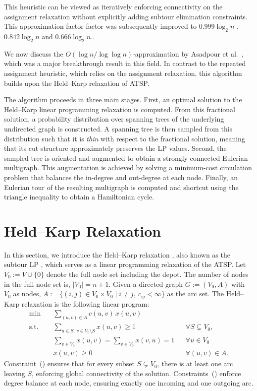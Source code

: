 \documentclass[12pt]{report}
\renewcommand{\eqref}[1]{\textup{(\textcolor{eqred}{\getrefnumber{#1}})}}
\theoremstyle{definition}
\begin{document}
This heuristic can be viewed as iteratively enforcing connectivity on the assignment relaxation without explicitly adding subtour elimination constraints. This approximation factor factor was subsequently improved to $0.999 \log_2 n$ \cite{blaser2002}, $0.842 \log_2 n$ \cite{Kaplan_decomposing} and $0.666 \log_2 n$.\cite{Singh_improved}.

We now discuss the $O(\log n / \log \log n)$-approximation by Asadpour et al.~\cite{asadpour}, which was a major breakthrough result in this field. In contrast to the repeated assignment heuristic, which relies on the assignment relaxation, this algorithm builds upon the Held--Karp relaxation \cite{HK_relaxation} of ATSP. 

The algorithm proceeds in three main stages. First, an optimal solution to the Held--Karp linear programming relaxation is computed. From this fractional solution, a probability distribution over spanning trees of the underlying undirected graph is constructed. A spanning tree is then sampled from this distribution such that it is \emph{thin} with respect to the fractional solution, meaning that its cut structure approximately preserves the LP values. Second, the sampled tree is oriented and augmented to obtain a strongly connected Eulerian multigraph. This augmentation is achieved by solving a minimum-cost circulation problem that balances the in-degree and out-degree at each node. Finally, an Eulerian tour of the resulting multigraph is computed and shortcut using the triangle inequality to obtain a Hamiltonian cycle.

\section{Held--Karp Relaxation}
In this section, we introduce the Held--Karp relaxation \cite{HK_relaxation}, also known as the subtour LP \cite{dfj1954}, which serves as a linear programming relaxation of the ATSP. Let \(V_0 := V \cup \{0\}\) denote the full node set including the depot. The number of nodes in the full node set is, \(|V_0| = n+1\). Given a directed graph \(G:=(V_0, A)\) with $V_0$ as nodes, \(A := \{(i,j) \in V_0\times V_0 \mid i \neq j,\ c_{ij} < \infty \}\) as the arc set. The Held--Karp relaxation is the following linear program:
\begin{align}
\min \quad & \sum_{(u,v) \in A} c(u,v) \, x(u,v) \\[0.3em]
\text{s.t.} \quad
& \sum_{u \in S,\, v \in V_0 \setminus S} x(u,v) \ge 1
&& \forall S \subsetneq V_0,
\label{HK_cut} \\[0.3em]
& \sum_{v \in V_0} x(u,v) = \sum_{v \in V_0} x(v,u) = 1
&& \forall u \in V_0
\label{HK_deg} \\[0.3em]
& x(u,v) \ge 0 && \forall (u,v) \in A.
\end{align}
Constraint~\eqref{HK_cut} ensures that for every subset $S \subsetneq V_0$, there is at least one arc leaving $S$, enforcing global connectivity of the solution. Constraints~\eqref{HK_deg} enforce degree balance at each node, ensuring exactly one incoming and one outgoing arc.
\end{document}
